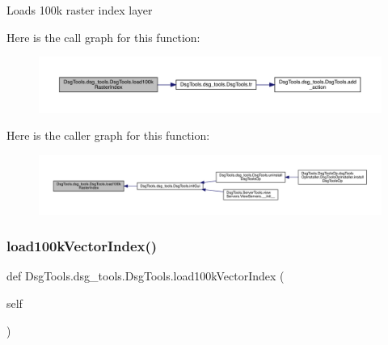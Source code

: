 \begin{DoxyVerb}Loads 100k raster index layer
\end{DoxyVerb}
 Here is the call graph for this function\+:
\nopagebreak
\begin{figure}[H]
\begin{center}
\leavevmode
\includegraphics[width=350pt]{class_dsg_tools_1_1dsg__tools_1_1_dsg_tools_a4ad69ff13c195868a4f0d8621dbbc60b_cgraph}
\end{center}
\end{figure}
Here is the caller graph for this function\+:
\nopagebreak
\begin{figure}[H]
\begin{center}
\leavevmode
\includegraphics[width=350pt]{class_dsg_tools_1_1dsg__tools_1_1_dsg_tools_a4ad69ff13c195868a4f0d8621dbbc60b_icgraph}
\end{center}
\end{figure}
\mbox{\label{class_dsg_tools_1_1dsg__tools_1_1_dsg_tools_af2223d0e1978719114b07789d36eeb53}} 
\subsubsection{\texorpdfstring{load100k\+Vector\+Index()}{load100kVectorIndex()}}
{\footnotesize\ttfamily def Dsg\+Tools.\+dsg\+\_\+tools.\+Dsg\+Tools.\+load100k\+Vector\+Index (\begin{DoxyParamCaption}\item[{}]{self }\end{DoxyParamCaption})}

